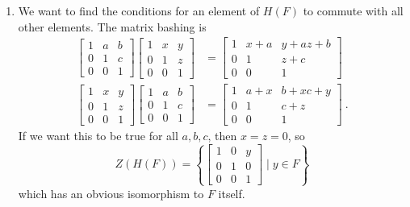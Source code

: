 \documentclass[]{article}
\begin{document}
\begin{enumerate}
\item We want to find the conditions for an element of $H(F)$ to commute with all other elements. The matrix bashing is
\begin{align}
\begin{bmatrix}1&a&b\\0&1&c\\0&0&1\end{bmatrix}\begin{bmatrix}1&x&y\\0&1&z\\0&0&1\end{bmatrix} &= \begin{bmatrix}1&x+a&y+az+b\\0&1&z+c\\0&0&1\end{bmatrix} \\
\begin{bmatrix}1&x&y\\0&1&z\\0&0&1\end{bmatrix}\begin{bmatrix}1&a&b\\0&1&c\\0&0&1\end{bmatrix} &= \begin{bmatrix}1&a+x&b+xc+y\\0&1&c+z\\0&0&1\end{bmatrix}\ .
\end{align}
If we want this to be true for all $a,b,c$, then $x=z=0$, so 
\begin{equation}
Z(H(F)) = \left\{ \begin{bmatrix}1&0&y\\0&1&0\\0&0&1\end{bmatrix}\mid y \in F \right\}
\end{equation}
which has an obvious isomorphism to $F$ itself.

\end{enumerate}
\end{document}

